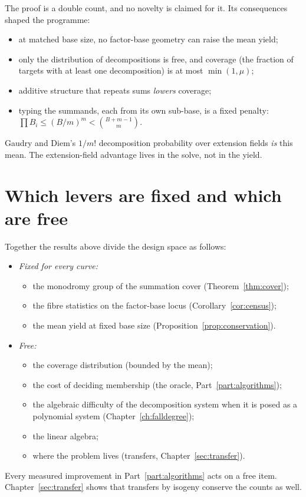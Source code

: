 The proof is a double count, and no novelty is claimed for it. Its
consequences shaped the programme:
\begin{itemize}
\item at matched base size, no factor-base geometry can raise the mean
  yield;
\item only the distribution of decompositions is free, and coverage
  (the fraction of targets with at least one decomposition) is at most
  $\min(1,\mu)$;
\item additive structure that repeats sums \emph{lowers} coverage;
\item typing the summands, each from its own sub-base, is a fixed penalty:
  $\prod B_i\le(B/m)^m<\binom{B+m-1}{m}$.
\end{itemize}
Gaudry and Diem's $1/m!$ decomposition probability over extension fields
\emph{is} this mean. The extension-field advantage lives in the solve, not
in the yield.

\section{Which levers are fixed and which are free}\label{sec:levers}

Together the results above divide the design space as follows:
\begin{itemize}
\item \emph{Fixed for every curve:}
  \begin{itemize}
  \item the monodromy group of the summation cover (Theorem~\ref{thm:cover});
  \item the fibre statistics on the factor-base locus
    (Corollary~\ref{cor:census});
  \item the mean yield at fixed base size (Proposition~\ref{prop:conservation}).
  \end{itemize}
\item \emph{Free:}
  \begin{itemize}
  \item the coverage distribution (bounded by the mean);
  \item the cost of deciding membership (the oracle, Part~\ref{part:algorithms});
  \item the algebraic difficulty of the decomposition system when it is
    posed as a polynomial system (Chapter~\ref{ch:falldegree});
  \item the linear algebra;
  \item where the problem lives (transfers, Chapter~\ref{sec:transfer}).
  \end{itemize}
\end{itemize}
Every measured improvement in Part~\ref{part:algorithms} acts on a free
item. Chapter~\ref{sec:transfer} shows that transfers by isogeny conserve
the counts as well.

